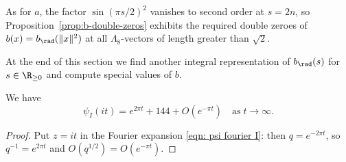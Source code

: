 As for $a$, the factor $\sin(\pi s/2)^2$ vanishes to second order at $s = 2n$, so Proposition~\ref{prop:b-double-zeros} exhibits the required double zeroes of $b(x) = b_\rad(\|x\|^2)$ at all $\Lambda_8$-vectors of length greater than $\sqrt 2$.

At the end of this section we find another integral representation of $b_\rad(s)$ for $s\in\R_{\geq0}$ and compute special values of $b$.

\begin{lemma}\label{lemma:psiI-asymptotic}\leanok
We have
\begin{equation}\label{eqn: psi asymptotic}
\psi_I(it)=e^{2\pi t}+144+O(e^{-\pi t})\quad\mbox{as}\;t\to\infty.
\end{equation}
\end{lemma}
\begin{proof}
Put $z = it$ in the Fourier expansion \eqref{eqn: psi fourier I}: then $q = e^{-2\pi t}$, so $q^{-1} = e^{2\pi t}$ and $O(q^{1/2}) = O(e^{-\pi t})$.
\end{proof}

